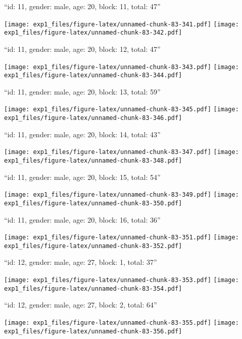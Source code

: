 \documentclass[11pt,,]{article}
\begin{document}
\newpage
[1] 

``id: 11, gender: male, age: 20, block: 11, total: 47''

\texttt{[image: exp1\_files/figure-latex/unnamed-chunk-83-341.pdf]}
\texttt{[image: exp1\_files/figure-latex/unnamed-chunk-83-342.pdf]}

\newpage
[1] 

``id: 11, gender: male, age: 20, block: 12, total: 47''

\texttt{[image: exp1\_files/figure-latex/unnamed-chunk-83-343.pdf]}
\texttt{[image: exp1\_files/figure-latex/unnamed-chunk-83-344.pdf]}

\newpage
[1] 

``id: 11, gender: male, age: 20, block: 13, total: 59''

\texttt{[image: exp1\_files/figure-latex/unnamed-chunk-83-345.pdf]}
\texttt{[image: exp1\_files/figure-latex/unnamed-chunk-83-346.pdf]}

\newpage
[1] 

``id: 11, gender: male, age: 20, block: 14, total: 43''

\texttt{[image: exp1\_files/figure-latex/unnamed-chunk-83-347.pdf]}
\texttt{[image: exp1\_files/figure-latex/unnamed-chunk-83-348.pdf]}

\newpage
[1] 

``id: 11, gender: male, age: 20, block: 15, total: 54''

\texttt{[image: exp1\_files/figure-latex/unnamed-chunk-83-349.pdf]}
\texttt{[image: exp1\_files/figure-latex/unnamed-chunk-83-350.pdf]}

\newpage
[1] 

``id: 11, gender: male, age: 20, block: 16, total: 36''

\texttt{[image: exp1\_files/figure-latex/unnamed-chunk-83-351.pdf]}
\texttt{[image: exp1\_files/figure-latex/unnamed-chunk-83-352.pdf]}

\newpage
[1] 

``id: 12, gender: male, age: 27, block: 1, total: 37''

\texttt{[image: exp1\_files/figure-latex/unnamed-chunk-83-353.pdf]}
\texttt{[image: exp1\_files/figure-latex/unnamed-chunk-83-354.pdf]}

\newpage
[1] 

``id: 12, gender: male, age: 27, block: 2, total: 64''

\texttt{[image: exp1\_files/figure-latex/unnamed-chunk-83-355.pdf]}
\texttt{[image: exp1\_files/figure-latex/unnamed-chunk-83-356.pdf]}
\end{document}
